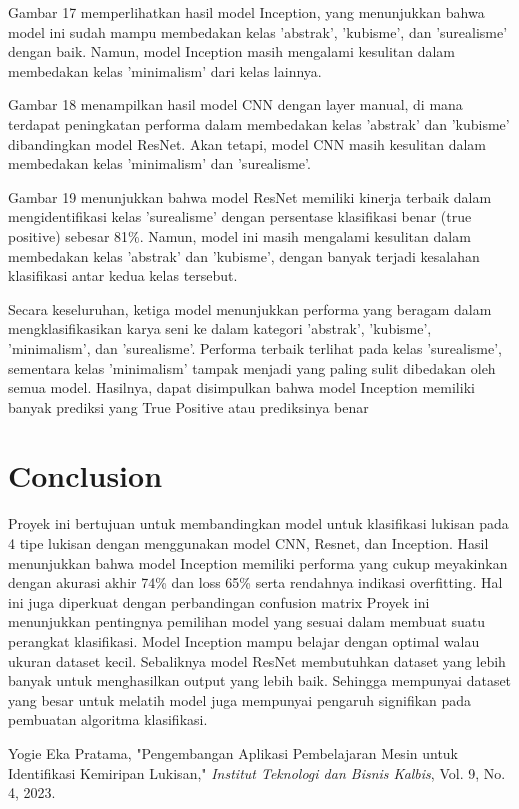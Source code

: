 \documentclass[12pt,a4paper]{article}
\begin{document}
Gambar 17 memperlihatkan hasil model Inception, yang menunjukkan bahwa model ini sudah mampu membedakan kelas 'abstrak', 'kubisme', dan 'surealisme' dengan baik. Namun, model Inception masih mengalami kesulitan dalam membedakan kelas 'minimalism' dari kelas lainnya.

Gambar 18 menampilkan hasil model CNN dengan layer manual, di mana terdapat peningkatan performa dalam membedakan kelas 'abstrak' dan 'kubisme' dibandingkan model ResNet. Akan tetapi, model CNN masih kesulitan dalam membedakan kelas 'minimalism' dan 'surealisme'.

Gambar 19 menunjukkan bahwa model ResNet memiliki kinerja terbaik dalam mengidentifikasi kelas 'surealisme' dengan persentase klasifikasi benar (true positive) sebesar 81\%. Namun, model ini masih mengalami kesulitan dalam membedakan kelas 'abstrak' dan 'kubisme', dengan banyak terjadi kesalahan klasifikasi antar kedua kelas tersebut.

Secara keseluruhan, ketiga model menunjukkan performa yang beragam dalam mengklasifikasikan karya seni ke dalam kategori 'abstrak', 'kubisme', 'minimalism', dan 'surealisme'. Performa terbaik terlihat pada kelas 'surealisme', sementara kelas 'minimalism' tampak menjadi yang paling sulit dibedakan oleh semua model. 
Hasilnya, dapat disimpulkan bahwa model Inception memiliki banyak prediksi yang True Positive atau prediksinya benar


\section{Conclusion}
Proyek ini bertujuan untuk membandingkan model untuk klasifikasi lukisan pada 4 tipe lukisan dengan menggunakan model CNN, Resnet, dan Inception. Hasil menunjukkan bahwa model Inception memiliki performa yang cukup meyakinkan dengan akurasi akhir 74\% dan loss 65\% serta rendahnya indikasi overfitting. Hal ini juga diperkuat dengan perbandingan confusion matrix
Proyek ini menunjukkan pentingnya pemilihan model yang sesuai dalam membuat suatu perangkat klasifikasi. Model Inception mampu belajar dengan optimal walau ukuran dataset kecil. Sebaliknya model ResNet membutuhkan dataset yang lebih banyak untuk menghasilkan output yang lebih baik. Sehingga mempunyai dataset yang besar untuk melatih model juga mempunyai pengaruh signifikan pada pembuatan algoritma klasifikasi.

\newpage

\begin{thebibliography}{9}

Yogie Eka Pratama, 
"Pengembangan Aplikasi Pembelajaran Mesin untuk Identifikasi Kemiripan Lukisan," 
\textit{Institut Teknologi dan Bisnis Kalbis},
Vol. 9, No. 4, 2023.


\end{thebibliography}
\end{document}
